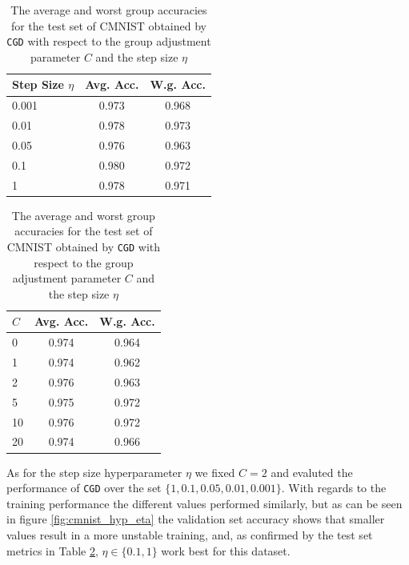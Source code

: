 \begin{table}[h!]
    \centering
    \begin{tabular}{lcc}
        \toprule
        \textbf{Step Size $\eta$} & \textbf{Avg. Acc.} & \textbf{W.g. Acc.} \\ 
        \midrule
        0.001 & 0.973 & 0.968 \\
        0.01 &  0.978 & 0.973 \\
        0.05 &  0.976 & 0.963 \\
        0.1 &   0.980 & 0.972 \\
        1 &     0.978 & 0.971 \\
    \bottomrule
    \end{tabular}
    \hspace{30pt}
    \begin{tabular}{lcc}
        \toprule
        \textbf{$C$} & \textbf{Avg. Acc.} & \textbf{W.g. Acc.} \\ 
        \midrule
        0 & 0.974 & 0.964 \\
        1 &  0.974 & 0.962 \\
        2 &  0.976 & 0.963 \\
        5 &  0.975 & 0.972 \\
        10 &  0.976 & 0.972 \\
        20 &  0.974 & 0.966 \\
    \bottomrule
    \end{tabular}    
    \caption{The average and worst group accuracies for the test set of CMNIST obtained by \texttt{CGD} with respect to the group adjustment parameter $C$ and the step size $\eta$}
    \label{tab:cmnist-hyps}
\end{table}

As for the step size hyperparameter $\eta$ we fixed $C = 2$ and evaluted the performance of \texttt{CGD} over the set $\{1,0.1,0.05,0.01,0.001\}$. With regards to the training performance the different values performed similarly, but as can be seen in figure \ref{fig:cmnist_hyp_eta} the validation set accuracy shows that smaller values result in a more unstable training, and, as confirmed by the test set metrics in Table \ref{tab:cmnist-hyps}, $\eta \in \{0.1, 1\}$ work best for this dataset.

